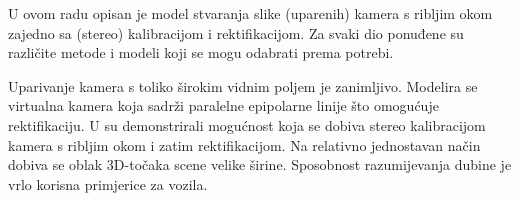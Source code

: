 \documentclass[../seminar.tex]{subfiles}
\begin{document}
U ovom radu opisan je model stvaranja slike (uparenih) kamera s ribljim okom zajedno sa (stereo) kalibracijom i rektifikacijom. Za svaki dio ponuđene su različite metode i modeli koji se mogu odabrati prema potrebi. 

Uparivanje kamera s toliko širokim vidnim poljem je zanimljivo. Modelira se virtualna kamera koja sadrži paralelne epipolarne linije što omogućuje rektifikaciju. U \cite{Abraham} su demonstrirali mogućnost koja se dobiva stereo kalibracijom kamera s ribljim okom i zatim rektifikacijom. Na relativno jednostavan način dobiva se oblak 3D-točaka scene velike širine. Sposobnost razumijevanja dubine je vrlo korisna primjerice za vozila.
\end{document}
